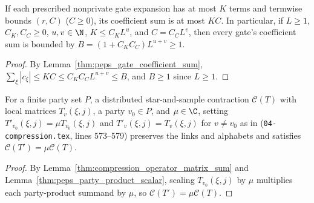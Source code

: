 \begin{lemma}
    \label{thm:peps_effect_coefficient_majorant}
    \leanok
    If each prescribed nonprivate gate expansion has at most $K$ terms and
    termwise bounds $(r,C)$ ($C\ge 0$), its coefficient sum is at most $KC$.
    In particular, if $L\geq1$, $C_K,C_C\geq0$, $u,v\in\N$, $K\leq C_KL^u$, and
    $C=C_CL^v$, then every gate's coefficient sum is bounded by
    $B=(1+C_KC_C)L^{u+v}\geq1$.
\end{lemma}
\begin{proof}
    \leanok
    By Lemma~\ref{thm:peps_gate_coefficient_sum},
    $\sum_\xi|c_\xi|\le KC\le C_KC_CL^{u+v}\le B$, and $B\ge 1$ since $L\ge 1$.
\end{proof}

\begin{lemma}
    \label{thm:peps_distributed_operator_scalar_absorption}
    \leanok
    For a finite party set $P$, a distributed star-and-sample contraction
    $\mathcal C(T)$ with local matrices $T_v(\xi,j)$, a party $v_0\in P$, and
    $\mu\in\C$, setting $T'_{v_0}(\xi,j)=\mu T_{v_0}(\xi,j)$ and
    $T'_v(\xi,j)=T_v(\xi,j)$ for $v\neq v_0$ as in
    \cite[proof of Theorem~5.2]{OpenAI2026PolynomialPEPS}
    (\texttt{04-compression.tex}, lines 573--579) preserves the links and
    alphabets and satisfies $\mathcal C(T')=\mu\mathcal C(T)$.
\end{lemma}

\begin{proof}
    \leanok
    By Lemma~\ref{thm:compression_operator_matrix_sum} and
    Lemma~\ref{thm:peps_party_product_scalar}, scaling $T_{v_0}(\xi,j)$ by
    $\mu$ multiplies each party-product summand by $\mu$, so
    $\mathcal C(T')=\mu\mathcal C(T)$.
\end{proof}
